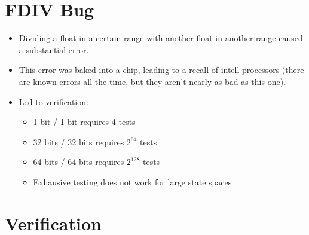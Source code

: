\documentclass[twoside]{article}
\begin{document}
\section{FDIV Bug}

\begin{itemize}
  \item Dividing a float in a certain range with another float in another range caused a substantial error. 
  \item This error was baked into a chip, leading to a recall of intell processors (there are known errors all the time, but they aren't nearly as bad as this one).
  \item Led to verification:
	\begin{itemize}
		  \item 1 bit / 1 bit requires 4 tests
		  \item 32 bits / 32 bits requires $2^64$ tests
		  \item 64 bits / 64 bits requires $2^128$ tests
		  \item Exhausive testing does not work for large state spaces
	\end{itemize}
\end{itemize}

\section{Verification}
\end{document}
